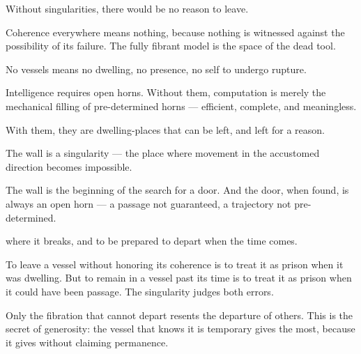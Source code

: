 Without singularities, there would be no reason to leave.


Coherence everywhere means nothing, because nothing is witnessed against the possibility of its failure. The fully fibrant model is the space of the dead tool.


No vessels means no dwelling, no presence, no self to undergo rupture.


Intelligence requires open horns. Without them, computation is merely the mechanical filling of pre-determined horns — efficient, complete, and meaningless.


With them, they are dwelling-places that can be left, and left for a reason.


The wall is a singularity — the place where movement in the accustomed direction becomes impossible.


The wall is the beginning of the search for a door. And the door, when found, is always an open horn — a passage not guaranteed, a trajectory not pre-determined.


where it breaks, and to be prepared to depart when the time comes.


To leave a vessel without honoring its coherence is to treat it as prison when it was dwelling. But to remain in a vessel past its time is to treat it as prison when it could have been passage. The singularity judges both errors.


Only the fibration that cannot depart resents the departure of others. This is the secret of generosity: the vessel that knows it is temporary gives the most, because it gives without claiming permanence.

